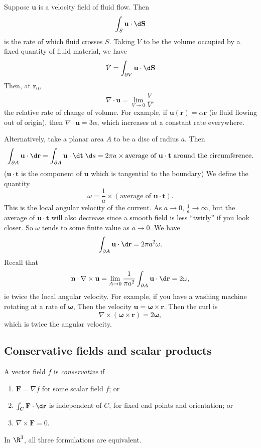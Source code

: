 \documentclass[a4paper]{article}
\begin{document}
\begin{eg}
  Suppose $\mathbf{u}$ is a velocity field of fluid flow. Then
  \[
    \int_S \mathbf{u}\cdot \d \mathbf{S}
  \]
  is the rate of which fluid crosses $S$. Taking $V$ to be the volume occupied by a fixed quantity of fluid material, we have
  \[
    \dot{V} = \int_{\partial V}\mathbf{u}\cdot \d \mathbf{S}
  \]
  Then, at $\mathbf{r}_0$,
  \[
    \nabla\cdot \mathbf{u} = \lim_{V\to 0}\frac{\dot{V}}{V},
  \]
  the relative rate of change of volume. For example, if $\mathbf{u}(\mathbf{r}) = \alpha\mathbf{r}$ (ie fluid flowing out of origin), then $\nabla\cdot \mathbf{u} = 3\alpha$, which increases at a constant rate everywhere.

  Alternatively, take a planar area $A$ to be a disc of radius $a$. Then
  \[
    \int_{\partial A}\mathbf{u}\cdot \d \mathbf{r} = \int_{\partial A}\mathbf{u}\cdot \d \mathbf{t} \;\d s = 2\pi a \times \text{average of $\mathbf{u}\cdot \mathbf{t}$ around the circumference}.
  \]
  ($\mathbf{u}\cdot \mathbf{t}$ is the component of $\mathbf{u}$ which is tangential to the boundary) We define the quantity
  \[
    \omega = \frac{1}{a} \times (\text{average of }\mathbf{u}\cdot \mathbf{t}).
  \]
  This is the local angular velocity of the current. As $a \to 0$, $\frac{1}{a} \to \infty$, but the average of $\mathbf{u}\cdot \mathbf{t}$ will also decrease since a smooth field is less ``twirly'' if you look closer. So $\omega$ tends to some finite value as $a\to 0$. We have
  \[
    \int_{\partial A} \mathbf{u}\cdot \d \mathbf{r} = 2\pi a^2 \omega.
  \]
  Recall that
  \[
    \mathbf{n}\cdot \nabla \times \mathbf{u} = \lim_{A \to 0}\frac{1}{\pi a^2}\int_{\partial A}\mathbf{u}\cdot \d \mathbf{r} = 2\omega,
  \]
  ie twice the local angular velocity. For example, if you have a washing machine rotating at a rate of $\boldsymbol\omega$, Then the velocity $\mathbf{u} = \boldsymbol\omega\times \mathbf{r}$. Then the curl is
  \[
    \nabla\times (\boldsymbol\omega\times \mathbf{r}) = 2\boldsymbol\omega,
  \]
  which is twice the angular velocity.
\end{eg}

\subsection{Conservative fields and scalar products}
\begin{defi}
  A vector field $f$ is \emph{conservative} if
  \begin{enumerate}
    \item $\mathbf{F} = \nabla f$ for some scalar field $f$; or
    \item $\int_C \mathbf{F}\cdot \d \mathbf{r}$ is independent of $C$, for fixed end points and orientation; or
    \item $\nabla \times \mathbf{F} = 0$.
  \end{enumerate}
  In $\R^3$, all three formulations are equivalent.
\end{defi}
\end{document}
